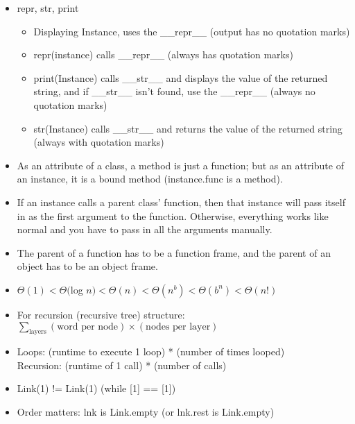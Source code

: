 \documentclass{article}
\begin{document}
\begin{itemize}
	\item repr, str, print
	\begin{itemize}
		\item Displaying Instance, uses the \_\_repr\_\_ (output has no quotation marks)
		\item repr(instance) calls \_\_repr\_\_ (always has quotation marks)
		\item print(Instance) calls \_\_str\_\_ and displays the value of the returned string, and if \_\_str\_\_ isn't found, use the \_\_repr\_\_ (always no quotation marks)
		\item str(Instance) calls \_\_str\_\_ and returns the value of the returned string (always with quotation marks)
	\end{itemize}
	\item As an attribute of a class, a method is just a function; but as an attribute of an instance, it is a bound method (instance.func is a method).
	\item If an instance calls a parent class' function, then that instance will pass itself in as the first argument to the function. Otherwise, everything works like normal and you have to pass in all the arguments manually.
	\item The parent of a function has to be a function frame, and the parent of an object has to be an object frame.
\end{itemize}

\begin{itemize}
	\item $\Theta(1) < \Theta($log $n) < \Theta(n) < \Theta(n^b) < \Theta(b^n) < \Theta(n!)$
	\item For recursion (recursive tree) structure: $\sum\limits_{\text{layers}}(\text{word per node})\times(\text{nodes per layer})$
	\item Loops: (runtime to execute 1 loop) * (number of times looped) \\
	Recursion: (runtime of 1 call) * (number of calls)
	\item {\color{red} Link(1) != Link(1)} (while [1] == [1])
	\item Order matters: lnk is Link.empty (or lnk.rest is Link.empty)
\end{itemize}
\end{document}
